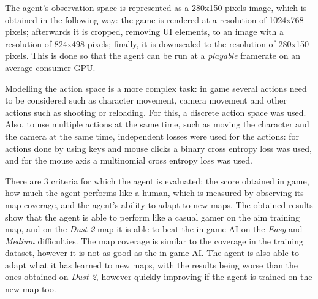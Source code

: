 The agent's observation space is represented as a 280x150 pixels image, which is obtained in the following way: the game is rendered at a resolution of 1024x768 pixels; afterwards it is cropped, removing UI elements, to an image with a resolution of 824x498 pixels; finally, it is downscaled to the resolution of 280x150 pixels. This is done so that the agent can be run at a \emph{playable} framerate on an average consumer GPU.

Modelling the action space is a more complex task: in game several actions need to be considered such as character movement, camera movement and other actions such as shooting or reloading. For this, a discrete action space was used. Also, to use multiple actions at the same time, such as moving the character and the camera at the same time, independent losses were used for the actions: for actions done by using keys and mouse clicks a binary cross entropy loss was used, and for the mouse axis a multinomial cross entropy loss was used.

There are 3 criteria for which the agent is evaluated: the score obtained in game, how much the agent performs like a human, which is measured by observing its map coverage, and the agent's ability to adapt to new maps. The obtained results show that the agent is able to perform like a casual gamer on the aim training map, and on the \emph{Dust 2} map it is able to beat the in-game AI on the \emph{Easy} and \emph{Medium} difficulties. The map coverage is similar to the coverage in the training dataset, however it is not as good as the in-game AI. The agent is also able to adapt what it has learned to new maps, with the results being worse than the ones obtained on \emph{Dust 2}, however quickly improving if the agent is trained on the new map too.
